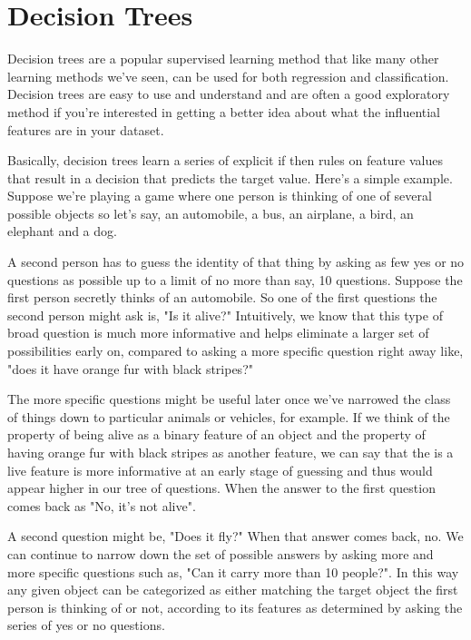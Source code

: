 \section{Decision Trees}
\begin{multicols}{2}

Decision trees are a popular supervised learning method that like many other learning methods we've seen, can be used for both regression and classification. Decision trees are easy to use and understand and are often a good exploratory method if you're interested in getting a better idea about what the influential features are in your dataset. 

Basically, decision trees learn a series of explicit if then rules on feature values that result in a decision that predicts the target value. Here's a simple example. Suppose we're playing a game where one person is thinking of one of several possible objects so let's say, an automobile, a bus, an airplane, a bird, an elephant and a dog. 

A second person has to guess the identity of that thing by asking as few yes or no questions as possible up to a limit of no more than say, 10 questions. Suppose the first person secretly thinks of an automobile. So one of the first questions the second person might ask is, "Is it alive?" Intuitively, we know that this type of broad question is much more informative and helps eliminate a larger set of possibilities early on, compared to asking a more specific question right away like, "does it have orange fur with black stripes?" 

The more specific questions might be useful later once we've narrowed the class of things down to particular animals or vehicles, for example. If we think of the property of being alive as a binary feature of an object and the property of having orange fur with black stripes as another feature, we can say that the is a live feature is more informative at an early stage of guessing and thus would appear higher in our tree of questions. When the answer to the first question comes back as "No, it's not alive". 

A second question might be, "Does it fly?" When that answer comes back, no. We can continue to narrow down the set of possible answers by asking more and more specific questions such as, "Can it carry more than 10 people?". In this way any given object can be categorized as either matching the target object the first person is thinking of or not, according to its features as determined by asking the series of yes or no questions. 


\end{multicols}
